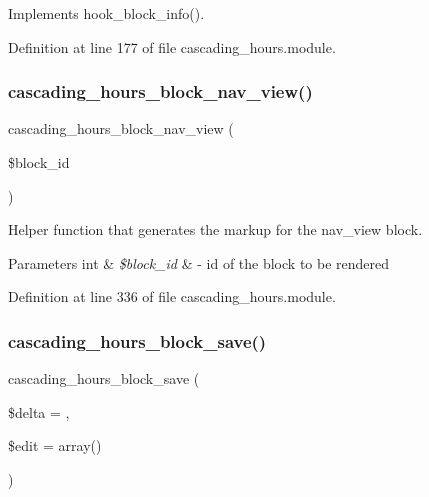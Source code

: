 Implements hook\+\_\+block\+\_\+info(). 



Definition at line 177 of file cascading\+\_\+hours.\+module.

\mbox{\label{cascading__hours_8module_ab15ff5d4e3e188a0a108ee91d5dd2633_ab15ff5d4e3e188a0a108ee91d5dd2633}} 
\subsubsection{\texorpdfstring{cascading\+\_\+hours\+\_\+block\+\_\+nav\+\_\+view()}{cascading\_hours\_block\_nav\_view()}}
{\footnotesize\ttfamily cascading\+\_\+hours\+\_\+block\+\_\+nav\+\_\+view (\begin{DoxyParamCaption}\item[{}]{\$block\+\_\+id }\end{DoxyParamCaption})}



Helper function that generates the markup for the nav\+\_\+view block. 


\begin{DoxyParams}[1]{Parameters}
int & {\em \$block\+\_\+id} & -\/ id of the block to be rendered \\
\hline
\end{DoxyParams}


Definition at line 336 of file cascading\+\_\+hours.\+module.

\mbox{\label{cascading__hours_8module_a142e02e075672ace77c9d5d703f37124_a142e02e075672ace77c9d5d703f37124}} 
\subsubsection{\texorpdfstring{cascading\+\_\+hours\+\_\+block\+\_\+save()}{cascading\_hours\_block\_save()}}
{\footnotesize\ttfamily cascading\+\_\+hours\+\_\+block\+\_\+save (\begin{DoxyParamCaption}\item[{}]{\$delta = {\ttfamily \textquotesingle{}\textquotesingle{}},  }\item[{}]{\$edit = {\ttfamily array()} }\end{DoxyParamCaption})}



